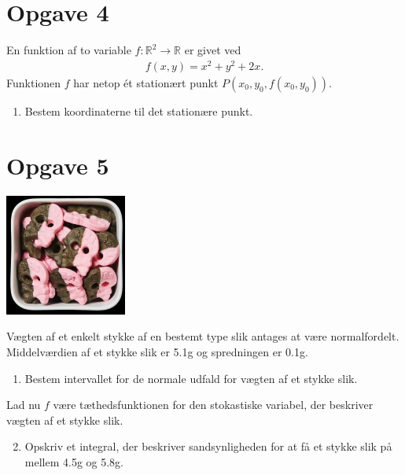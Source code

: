 \section*{Opgave 4}
En funktion af to variable $f: \mathbb{R}^2 \to \mathbb{R}$ er givet ved
\begin{align*}
	f(x,y) = x^2+y^2+2x.
\end{align*}
Funktionen $f$ har netop ét stationært punkt $P(x_0,y_0,f(x_0,y_0))$. 
\begin{enumerate}[label=\roman*)]
	\item Bestem koordinaterne til det stationære punkt. 
\end{enumerate}

\section*{Opgave 5}
\begin{center}
	\includegraphics[width=0.3\textwidth]{Billeder/Kranier.jpg}
\end{center}
Vægten af et enkelt stykke af en bestemt type slik antages at være normalfordelt. Middelværdien af et stykke slik er 5.1g og spredningen er 0.1g.
\begin{enumerate}[label=\roman*)]
	\item Bestem intervallet for de normale udfald for vægten af et stykke slik.
\end{enumerate}
Lad nu $f$ være tæthedsfunktionen for den stokastiske variabel, der beskriver vægten af et stykke slik.
\begin{enumerate}[label=\roman*)]
	\setcounter{enumi}{1}
	\item Opskriv et integral, der beskriver sandsynligheden for at få et stykke slik på mellem 4.5g og 5.8g.
\end{enumerate}